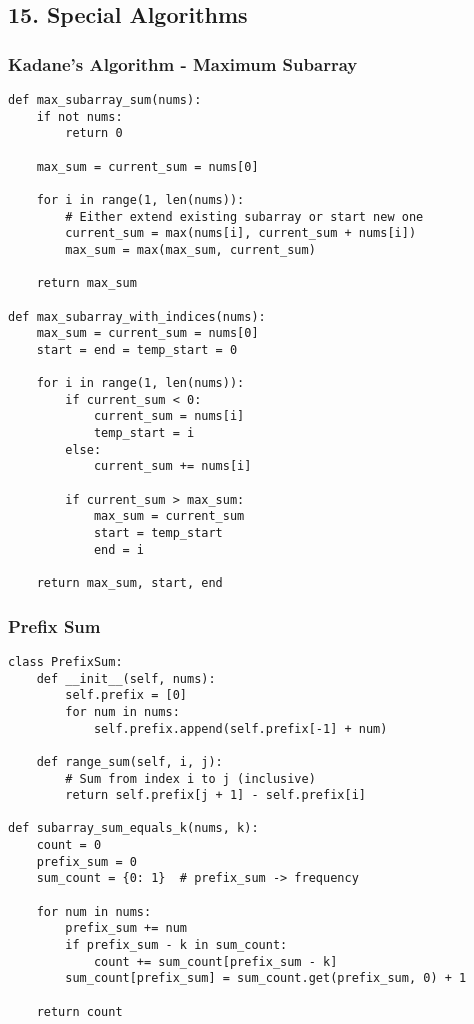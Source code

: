 \documentclass[10pt,a4paper]{article}
\begin{document}
\subsection{15. Special Algorithms}

\subsubsection{Kadane's Algorithm - Maximum Subarray}
\begin{lstlisting}
def max_subarray_sum(nums):
    if not nums:
        return 0

    max_sum = current_sum = nums[0]

    for i in range(1, len(nums)):
        # Either extend existing subarray or start new one
        current_sum = max(nums[i], current_sum + nums[i])
        max_sum = max(max_sum, current_sum)

    return max_sum

def max_subarray_with_indices(nums):
    max_sum = current_sum = nums[0]
    start = end = temp_start = 0

    for i in range(1, len(nums)):
        if current_sum < 0:
            current_sum = nums[i]
            temp_start = i
        else:
            current_sum += nums[i]

        if current_sum > max_sum:
            max_sum = current_sum
            start = temp_start
            end = i

    return max_sum, start, end
\end{lstlisting}

\subsubsection{Prefix Sum}
\begin{lstlisting}
class PrefixSum:
    def __init__(self, nums):
        self.prefix = [0]
        for num in nums:
            self.prefix.append(self.prefix[-1] + num)

    def range_sum(self, i, j):
        # Sum from index i to j (inclusive)
        return self.prefix[j + 1] - self.prefix[i]

def subarray_sum_equals_k(nums, k):
    count = 0
    prefix_sum = 0
    sum_count = {0: 1}  # prefix_sum -> frequency

    for num in nums:
        prefix_sum += num
        if prefix_sum - k in sum_count:
            count += sum_count[prefix_sum - k]
        sum_count[prefix_sum] = sum_count.get(prefix_sum, 0) + 1

    return count
\end{lstlisting}
\end{document}
